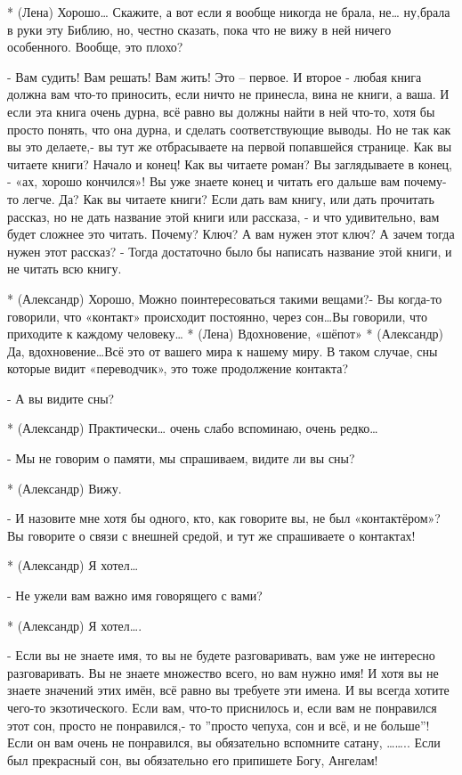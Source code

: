 * (Лена) Хорошо… Скажите, а вот если я вообще никогда не брала, не… ну,брала в руки эту Библию, но, честно сказать, пока что не вижу в ней ничего особенного. Вообще, это плохо?

- Вам судить! Вам решать! Вам жить! Это – первое. И второе - любая книга должна вам что-то приносить, если ничто не принесла, вина не книги, а ваша. И если эта книга очень дурна, всё равно вы должны найти в ней что-то, хотя бы просто понять, что она дурна, и сделать соответствующие выводы. Но не так как вы это делаете,- вы тут же отбрасываете на первой попавшейся странице. Как вы читаете книги? Начало и конец! Как вы читаете роман? Вы заглядываете в конец, - «ах, хорошо кончился»! Вы уже знаете конец и читать его дальше вам почему-то легче. Да? Как вы читаете книги? Если дать вам книгу, или дать прочитать рассказ, но не дать название этой книги или рассказа, - и что удивительно, вам будет сложнее это читать. Почему? Ключ? А вам нужен этот ключ? А зачем тогда нужен этот рассказ? - Тогда достаточно было бы написать название этой книги, и не читать всю книгу.

* (Александр) Хорошо, Можно поинтересоваться такими вещами?- Вы когда-то говорили, что «контакт» происходит постоянно, через сон…Вы говорили, что  приходите к каждому человеку…
* (Лена) Вдохновение, «шёпот»
* (Александр) Да, вдохновение…Всё это от вашего мира к нашему миру. В таком случае, сны которые видит «переводчик», это тоже продолжение контакта?

- А вы видите сны?

* (Александр) Практически… очень слабо вспоминаю, очень редко…

- Мы не говорим о памяти, мы спрашиваем, видите ли вы сны?

* (Александр) Вижу.

- И назовите мне хотя бы одного, кто, как говорите вы, не был «контактёром»? Вы говорите о связи с внешней средой, и тут же спрашиваете о контактах! 

* (Александр) Я хотел…

- Не ужели вам важно имя говорящего с вами?

* (Александр) Я хотел….

- Если вы не знаете имя, то вы не будете разговаривать, вам уже не интересно разговаривать.  Вы не знаете множество всего, но вам нужно имя! И хотя вы не знаете значений этих имён, всё равно вы требуете эти имена. И вы всегда хотите чего-то экзотического. Если вам, что-то приснилось и, если вам не понравился этот сон, просто не понравился,- то ”просто чепуха, сон и всё, и не больше”! Если он вам очень не понравился, вы обязательно вспомните сатану, …….. Если был прекрасный сон, вы обязательно его припишете Богу, Ангелам!

